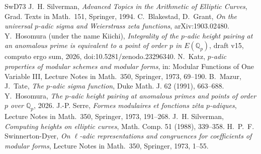 \documentclass[11pt,a4paper]{amsart}
\newcommand{\Qp}{\mathbb{Q}_p}
\theoremstyle{plain}
\theoremstyle{definition}
\theoremstyle{remark}
\begin{document}
\begin{thebibliography}{SwD73}
 J.~H. Silverman, \emph{Advanced Topics in the Arithmetic of Elliptic Curves}, Grad. Texts in Math.~151, Springer, 1994.
 C.~Blakestad, D.~Grant, \emph{On the universal $p$-adic sigma and Weierstrass zeta functions}, arXiv:1903.02480.
 Y.~Hosomura (under the name Kiichi), \emph{Integrality of the $p$-adic height pairing at an anomalous prime is equivalent to a point of order $p$ in $E(\Qp)$}, draft v15, computo ergo sum, 2026, doi:10.5281/zenodo.23296340.
 N.~Katz, \emph{$p$-adic properties of modular schemes and modular forms}, in: Modular Functions of One Variable III, Lecture Notes in Math.~350, Springer, 1973, 69--190.
 B.~Mazur, J.~Tate, \emph{The $p$-adic sigma function}, Duke Math. J. 62 (1991), 663--688.
 Y.~Hosomura, \emph{The $p$-adic height pairing at anomalous primes and points of order $p$ over $\Qp$}, 2026.
 J.-P. Serre, \emph{Formes modulaires et fonctions zêta $p$-adiques}, Lecture Notes in Math.~350, Springer, 1973, 191--268.
 J.~H. Silverman, \emph{Computing heights on elliptic curves}, Math. Comp. 51 (1988), 339--358.
 H.~P.~F. Swinnerton-Dyer, \emph{On $\ell$-adic representations and congruences for coefficients of modular forms}, Lecture Notes in Math.~350, Springer, 1973, 1--55.
\end{thebibliography}
\end{document}
